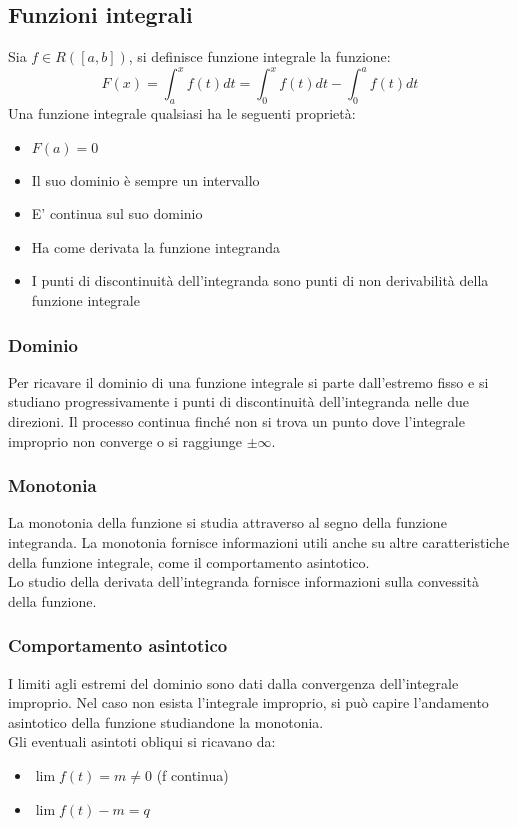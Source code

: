 \documentclass{article}
\begin{document}
\subsection{Funzioni integrali}
Sia $f\in R([a,b])$, si definisce funzione integrale la funzione:
$$F(x)=\int_a^x f(t)dt=\int_0^x f(t)dt-\int_0^a f(t)dt $$
Una funzione integrale qualsiasi ha le seguenti proprietà:
\begin{itemize}
    \item $F(a)=0$
    \item Il suo dominio è sempre un intervallo
    \item E' continua sul suo dominio
    \item Ha come derivata la funzione integranda
    \item I punti di discontinuità dell'integranda sono punti di non derivabilità della funzione integrale
\end{itemize}

\subsubsection{Dominio}
Per ricavare il dominio di una funzione integrale si parte dall'estremo fisso e si studiano progressivamente i punti di discontinuità dell'integranda nelle due direzioni. Il processo continua finché non si trova un punto dove l'integrale improprio non converge o si raggiunge $\pm\infty$.

\subsubsection{Monotonia}
La monotonia della funzione si studia attraverso al segno della funzione integranda. La monotonia fornisce informazioni utili anche su altre caratteristiche della funzione integrale, come il comportamento asintotico.\\
Lo studio della derivata dell'integranda fornisce informazioni sulla convessità della funzione.

\subsubsection{Comportamento asintotico}
I limiti agli estremi del dominio sono dati dalla convergenza dell'integrale improprio. Nel caso non esista l'integrale improprio, si può capire l'andamento asintotico della funzione studiandone la monotonia.\\
Gli eventuali asintoti obliqui si ricavano da:
\begin{itemize}
    \item $\lim f(t)=m\neq0$ (f continua)
    \item $\lim f(t)-m=q$
\end{itemize}
\end{document}
